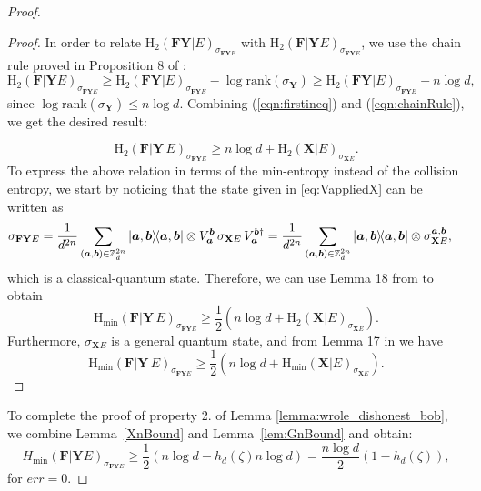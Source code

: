 \begin{proof}
\begin{proof}
In order to relate $\text{H}_2(\mathbf{F}\mathbf{Y} | E)_{\sigma_{\mathbf{F}\mathbf{Y} E}}$ with $\text{H}_2(\mathbf{F} | \mathbf{Y} E)_{\sigma_{\mathbf{F}\mathbf{Y} E}}$, we use the chain rule proved in Proposition 8 of \cite{MDSFT13}:
\begin{equation}
\text{H}_2(\mathbf{F} | \mathbf{Y} E)_{\sigma_{\mathbf{F}\mathbf{Y} E}} \geq \text{H}_2(\mathbf{F}\mathbf{Y} | E)_{\sigma_{\mathbf{F}\mathbf{Y} E}} - \log \text{rank}(\sigma_{\mathbf{Y}}) \geq \text{H}_2(\mathbf{F}\mathbf{Y} | E)_{\sigma_{\mathbf{F}\mathbf{Y} E}} - n \log d,
 \label{eqn:chainRule} 
\end{equation}
since $\log \text{rank}(\sigma_{\mathbf{Y}}) \leq n \log d$. Combining (\ref{eqn:firstineq}) and (\ref{eqn:chainRule}), we get the desired result:

\begin{equation*}
    \text{H}_2(\mathbf{F}|\mathbf{Y}\, E)_{\sigma_{\mathbf{F}\mathbf{Y} E}} \geq n\log d + \text{H}_2(\mathbf{X}| E)_{\sigma_{\mathbf{X} E}}.
\end{equation*}
To express the above relation in terms of the min-entropy instead of the collision entropy, we start by noticing that 
 the state given in \eqref{eq:VappliedX} can be written as 
\begin{align}
  \sigma_{\mathbf{F}\mathbf{Y} E} &= \frac{1}{d^{2n}} \sum_{(\bm{a}, \bm{b}) \in \mathbb{Z}^{2n}_d} \ketbra{\bm{a},\bm{b}}\otimes V^{\bm{b}}_{\bm{a}} \, \sigma_{\mathbf{X} E}\,  V^{\bm{b}\dagger}_{\bm{a}} = \frac{1}{d^{2n}} \sum_{(\bm{a}, \bm{b}) \in \mathbb{Z}^{2n}_d} \ketbra{\bm{a},\bm{b}}\otimes \sigma_{\mathbf{X} E}^{\bm{a},\bm{b}},
\end{align}
which is a classical-quantum state. Therefore, we can use Lemma 18 from \cite{Dupuis2015} to obtain
\begin{equation*}
     \text{H}_{\text{min}}(\mathbf{F}|\mathbf{Y}\, E)_{\sigma_{\mathbf{F}\mathbf{Y} E}}  \geq \frac{1}{2}\left(n\log d + \text{H}_2(\mathbf{X}| E)_{\sigma_{\mathbf{X} E}}\right).
\end{equation*}
Furthermore,  $\sigma_{\mathbf{X}E}$  is a general quantum state, and from Lemma 17 in \cite{Dupuis2015} we have 
\begin{equation*}
    \text{H}_{\text{min}}(\mathbf{F}|\mathbf{Y}\, E)_{\sigma_{\mathbf{F}\mathbf{Y} E}}  \geq \frac{1}{2}\left(n\log d + \text{H}_{\text{min}}(\mathbf{X}| E)_{\sigma_{\mathbf{X} E}} \right).
\end{equation*}
\end{proof}



To complete the proof of property 2. of Lemma \ref{lemma:wrole_dishonest_bob}, we  combine Lemma~\ref{XnBound} and Lemma~\ref{lem:GnBound}  and obtain:
\begin{equation*}
H_{\min}(\mathbf{F} | \mathbf{Y} E)_{\sigma_{\mathbf{F}\mathbf{Y} E}} \geq \frac{1}{2}(n\log d - h_d(\zeta)n\log d) = \frac{n\log d}{2}(1 - h_d(\zeta)),
\end{equation*}
for $err = 0$.

\end{proof}

